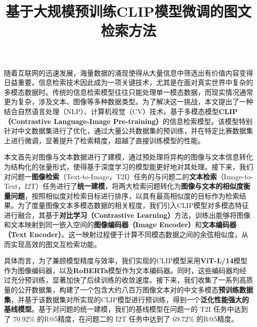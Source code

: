 \documentclass[a4paper]{zreport}
\title{基于大规模预训练CLIP模型微调的图文检索方法}
\begin{document}
\newpage

\vphantom{\Large hello}


\begingroup
{}

\vspace{3em}


\endgroup

\vspace{1em}

随着互联网的迅速发展，海量数据的涌现使得从大量信息中筛选出有价值内容变得日益重要。信息检索技术因此成为一项关键技术，尤其是在面对真实世界中复杂的多模态数据时。传统的信息检索模型往往只能处理单一模态数据，而现实情况通常更为复杂，涉及文本、图像等多种数据类型。为了解决这一挑战，本文提出了一种结合自然语言处理（NLP）、计算机视觉（CV）技术，基于多模态模型\textbf{CLIP（Contrastive Language-Image Pre-training）}的信息检索模型。该模型特别针对中文数据集进行了优化，通过大量公共数据集的预训练，并在特定比赛数据集上进行微调，显著提升了检索精度，超越了直接训练模型的性能。

本文首先对图像与文本数据进行了建模，通过预处理将异构的图像与文本信息转化为结构化的张量形式，使得基于深度学习的模型能更好地对其处理。接下来，我们对问题一\textbf{图像检索}（Text-to-Image，T2I）任务的与问题二的\textbf{文本检索}（Image-to-Text，I2T）任务进行了\textbf{统一建模}，将两大检索问题转化为\textbf{图像与文本的相似度衡量问题}，按照相似度对检索目标进行排序，以具有最高相似度的目标作为检索结果。为了度量图像文本多模态数据的相关程度，我们引入CLIP模型对多模态特征进行融合，其基于\textbf{对比学习（Contrastive Learning）}方法，训练出能够将图像和文本映射到同一嵌入空间的\textbf{图像编码器（Image Encoder）}和\textbf{文本编码器（Text Encoder）}。这一映射过程便于计算不同模态数据之间的余弦相似度，从而实现高效的图文互检索功能。

具体而言，为了兼顾模型精度与效率，我们实现的CLIP模型采用\textbf{ViT-L/14}模型作为图像编码器，以及\textbf{RoBERTa}模型作为文本编码器。同时，这些编码器均经过充分预训练，显著加快了后续训练的收敛速度。接下来，我们收集了一系列高质量的公开数据集，构建了一个包含大约八百万图像文本对的中文多模态\textbf{预训练数据集}，并基于该数据集对所实现的CLIP模型进行预训练，得到一个\textbf{泛化性能强大的基线模型}。基于对问题的统一建模，我们的基线模型在问题一的 T2I 任务中达到了 70.92\% 的R@5精度，在问题二的 I2T 任务中达到了 69.72\% 的R@5精度。
\end{document}
